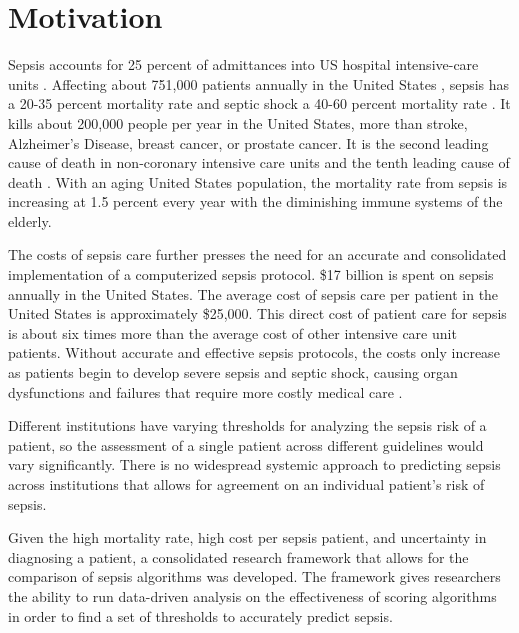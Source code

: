 \documentclass{sig-alternate}
\begin{document}
\vspace{10pt}
\section{Motivation}
\vspace{10pt}
\label{sec:motivation}

Sepsis accounts for 25 percent of admittances into US hospital intensive-care units \cite{epi}. Affecting about 751,000 patients annually in the United States \cite{sepsis_def}, sepsis has a 20-35 percent mortality rate and septic shock a 40-60 percent mortality rate \cite{meds}. It kills about 200,000 people per year in the United States, more than stroke, Alzheimer's Disease, breast cancer, or prostate cancer. It is the second leading cause of death in non-coronary intensive care units and the tenth leading cause of death \cite{epi}. With an aging United States population, the mortality rate from sepsis is increasing at 1.5 percent every year with the diminishing immune systems of the elderly.

The costs of sepsis care further presses the need for an accurate and consolidated implementation of a computerized sepsis protocol. \$17 billion is spent on sepsis annually in the United States. The average cost of sepsis care per patient in the United States is approximately \$25,000. This direct cost of patient care for sepsis is about six times more than the average cost of other intensive care unit patients. Without accurate and effective sepsis protocols, the costs only increase as patients begin to develop severe sepsis and septic shock, causing organ dysfunctions and failures that require more costly medical care \cite{yearbook}.

Different institutions have varying thresholds for analyzing the sepsis risk of a patient, so the assessment of a single patient across different guidelines would vary significantly. There is no widespread systemic approach to predicting sepsis across institutions that allows for agreement on an individual patient's risk of sepsis. 

Given the high mortality rate, high cost per sepsis patient, and uncertainty in diagnosing a patient, a consolidated research framework that allows for the comparison of sepsis algorithms was developed.  The framework gives researchers the ability to run data-driven analysis on the effectiveness of scoring algorithms in order to find a set of thresholds to accurately predict sepsis.

\vspace{10pt}
\end{document}
